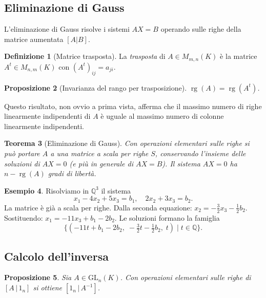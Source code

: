 \documentclass[11pt, a4paper]{book}
\theoremstyle{definition}
\newtheorem{definizione}{Definizione}[section]
\newtheorem{esempio}[definizione]{Esempio}
\theoremstyle{plain}
\newtheorem{teorema}[definizione]{Teorema}
\newtheorem{proposizione}[definizione]{Proposizione}
\theoremstyle{remark}
\newcommand{\Q}{\mathbb{Q}}
\DeclareMathOperator{\rg}{rg}
\newcommand{\GL}{\mathrm{GL}}
\begin{document}
\subsection{Eliminazione di Gauss}

L'eliminazione di Gauss risolve i sistemi $AX = B$ operando sulle righe della matrice aumentata $[A|B]$.

\begin{defbox}
\begin{definizione}[Matrice trasposta]
La \emph{trasposta} di $A \in M_{m,n}(K)$ è la matrice $A^t \in M_{n,m}(K)$ con $(A^t)_{ij} = a_{ji}$.
\end{definizione}
\end{defbox}

\begin{proposizione}[Invarianza del rango per trasposizione]
$\rg(A) = \rg(A^t)$.
\end{proposizione}

Questo risultato, non ovvio a prima vista, afferma che il massimo numero di righe linearmente indipendenti di $A$ è uguale al massimo numero di colonne linearmente indipendenti.

\begin{teorema}[Eliminazione di Gauss]
Con operazioni elementari sulle righe si può portare $A$ a una matrice a scala per righe $S$, conservando l'insieme delle soluzioni di $AX = 0$ (e più in generale di $AX = B$). Il sistema $AX = 0$ ha $n - \rg(A)$ gradi di libertà.
\end{teorema}

\begin{exbox}
\begin{esempio}
Risolviamo in $\Q^3$ il sistema
\[
  x_1 - 4x_2 + 5x_3 = b_1, \quad 2x_2 + 3x_3 = b_2.
\]
La matrice è già a scala per righe. Dalla seconda equazione: $x_2 = -\tfrac{3}{2}x_3 - \tfrac{1}{2}b_2$. Sostituendo: $x_1 = -11x_3 + b_1 - 2b_2$. Le soluzioni formano la famiglia
\[
  \{(-11t + b_1 - 2b_2,\; -\tfrac{3}{2}t - \tfrac{1}{2}b_2,\; t) \mid t \in \Q\}.
\]
\end{esempio}
\end{exbox}

\subsection{Calcolo dell'inversa}

\begin{proposizione}
Sia $A \in \GL_n(K)$. Con operazioni elementari sulle righe di $[A \,|\, 1_n]$ si ottiene $[1_n \,|\, A^{-1}]$.
\end{proposizione}
\end{document}
